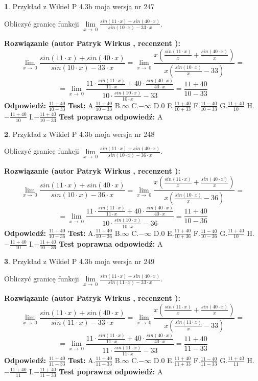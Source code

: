 \documentclass[12pt, a4paper]{article}
\theoremstyle{definition} %
\newtheorem{zad}{}
\newcommand{\zadStart}[1]{\begin{zad}#1\newline}
\newcommand{\zadStop}{\end{zad}}
\newcommand{\rozwStart}[2]{\noindent \textbf{Rozwiązanie (autor #1 , recenzent #2): }\newline}
\newcommand{\rozwStop}{\newline}
\newcommand{\odpStart}{\noindent \textbf{Odpowiedź:}\newline}
\newcommand{\odpStop}{\newline}
\newcommand{\testStart}{\noindent \textbf{Test:}\newline}
\newcommand{\testStop}{\newline}
\newcommand{\kluczStart}{\noindent \textbf{Test poprawna odpowiedź:}\newline}
\newcommand{\kluczStop}{\newline}
\begin{document}
\zadStart{Przykład z Wikieł P 4.3b moja wersja nr 247}


Obliczyć granicę funkcji $\lim\limits_{x\to\ 0}\frac{sin(11 \cdot x)+sin(40 \cdot x)}{sin(10 \cdot x)-33 \cdot x}$.
\zadStop
\rozwStart{Patryk Wirkus}{}
$$\lim\limits_{x\to\ 0}\frac{sin(11 \cdot x)+sin(40 \cdot x)}{sin(10 \cdot x)-33 \cdot x}=\lim\limits_{x\to\ 0}\frac{x(\frac{sin(11 \cdot x)}{x}+\frac{sin(40 \cdot x)}{x})}{x(\frac{sin(10 \cdot x)}{x}-33)}=$$
$$=\lim\limits_{x\to\ 0}\frac{11 \cdot \frac{sin(11 \cdot x)}{11 \cdot x}+40 \cdot \frac{sin(40 \cdot x)}{40 \cdot x}}{10 \cdot \frac{sin(10 \cdot x)}{10 \cdot x}-33}=\frac{11+40}{10-33}$$
\rozwStop
\odpStart
$\frac{11+40}{10-33}$
\odpStop
\testStart
A.$\frac{11+40}{10-33}$
B.$\infty$
C.$-\infty$
D.$0$
E.$\frac{11+40}{10+33}$
F.$\frac{11-40}{10-33}$
G.$\frac{11+40}{10}$
H.$-\frac{11+40}{10}$
I.$-\frac{11+40}{10-33}$
\testStop
\kluczStart
A
\kluczStop



\zadStart{Przykład z Wikieł P 4.3b moja wersja nr 248}


Obliczyć granicę funkcji $\lim\limits_{x\to\ 0}\frac{sin(11 \cdot x)+sin(40 \cdot x)}{sin(10 \cdot x)-36 \cdot x}$.
\zadStop
\rozwStart{Patryk Wirkus}{}
$$\lim\limits_{x\to\ 0}\frac{sin(11 \cdot x)+sin(40 \cdot x)}{sin(10 \cdot x)-36 \cdot x}=\lim\limits_{x\to\ 0}\frac{x(\frac{sin(11 \cdot x)}{x}+\frac{sin(40 \cdot x)}{x})}{x(\frac{sin(10 \cdot x)}{x}-36)}=$$
$$=\lim\limits_{x\to\ 0}\frac{11 \cdot \frac{sin(11 \cdot x)}{11 \cdot x}+40 \cdot \frac{sin(40 \cdot x)}{40 \cdot x}}{10 \cdot \frac{sin(10 \cdot x)}{10 \cdot x}-36}=\frac{11+40}{10-36}$$
\rozwStop
\odpStart
$\frac{11+40}{10-36}$
\odpStop
\testStart
A.$\frac{11+40}{10-36}$
B.$\infty$
C.$-\infty$
D.$0$
E.$\frac{11+40}{10+36}$
F.$\frac{11-40}{10-36}$
G.$\frac{11+40}{10}$
H.$-\frac{11+40}{10}$
I.$-\frac{11+40}{10-36}$
\testStop
\kluczStart
A
\kluczStop



\zadStart{Przykład z Wikieł P 4.3b moja wersja nr 249}


Obliczyć granicę funkcji $\lim\limits_{x\to\ 0}\frac{sin(11 \cdot x)+sin(40 \cdot x)}{sin(11 \cdot x)-33 \cdot x}$.
\zadStop
\rozwStart{Patryk Wirkus}{}
$$\lim\limits_{x\to\ 0}\frac{sin(11 \cdot x)+sin(40 \cdot x)}{sin(11 \cdot x)-33 \cdot x}=\lim\limits_{x\to\ 0}\frac{x(\frac{sin(11 \cdot x)}{x}+\frac{sin(40 \cdot x)}{x})}{x(\frac{sin(11 \cdot x)}{x}-33)}=$$
$$=\lim\limits_{x\to\ 0}\frac{11 \cdot \frac{sin(11 \cdot x)}{11 \cdot x}+40 \cdot \frac{sin(40 \cdot x)}{40 \cdot x}}{11 \cdot \frac{sin(11 \cdot x)}{11 \cdot x}-33}=\frac{11+40}{11-33}$$
\rozwStop
\odpStart
$\frac{11+40}{11-33}$
\odpStop
\testStart
A.$\frac{11+40}{11-33}$
B.$\infty$
C.$-\infty$
D.$0$
E.$\frac{11+40}{11+33}$
F.$\frac{11-40}{11-33}$
G.$\frac{11+40}{11}$
H.$-\frac{11+40}{11}$
I.$-\frac{11+40}{11-33}$
\testStop
\kluczStart
A
\kluczStop
\end{document}
